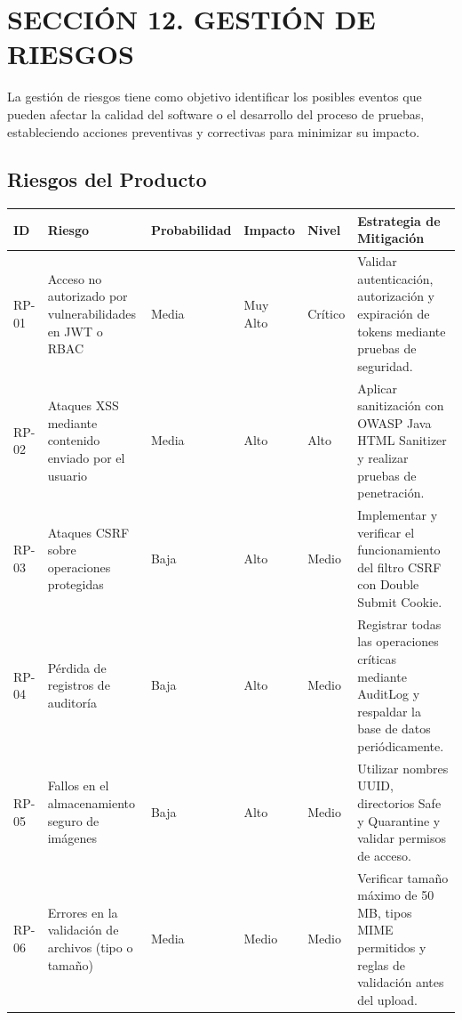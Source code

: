 \section{SECCIÓN 12. GESTIÓN DE RIESGOS}
La gestión de riesgos tiene como objetivo identificar los posibles eventos que pueden afectar la calidad del software o el desarrollo del proceso de pruebas, estableciendo acciones preventivas y correctivas para minimizar su impacto.

\subsection*{Riesgos del Producto}
\begin{longtable}{|p{1.5cm}|p{3.5cm}|p{2.5cm}|p{2cm}|p{2cm}|p{4cm}|}
\hline
\textbf{ID} & \textbf{Riesgo} & \textbf{Probabilidad} & \textbf{Impacto} & \textbf{Nivel} & \textbf{Estrategia de Mitigación} \\
\hline
RP-01 & Acceso no autorizado por vulnerabilidades en JWT o RBAC & Media & Muy Alto & Crítico & Validar autenticación, autorización y expiración de tokens mediante pruebas de seguridad. \\
\hline
RP-02 & Ataques XSS mediante contenido enviado por el usuario & Media & Alto & Alto & Aplicar sanitización con OWASP Java HTML Sanitizer y realizar pruebas de penetración. \\
\hline
RP-03 & Ataques CSRF sobre operaciones protegidas & Baja & Alto & Medio & Implementar y verificar el funcionamiento del filtro CSRF con Double Submit Cookie. \\
\hline
RP-04 & Pérdida de registros de auditoría & Baja & Alto & Medio & Registrar todas las operaciones críticas mediante AuditLog y respaldar la base de datos periódicamente. \\
\hline
RP-05 & Fallos en el almacenamiento seguro de imágenes & Baja & Alto & Medio & Utilizar nombres UUID, directorios Safe y Quarantine y validar permisos de acceso. \\
\hline
RP-06 & Errores en la validación de archivos (tipo o tamaño) & Media & Medio & Medio & Verificar tamaño máximo de 50 MB, tipos MIME permitidos y reglas de validación antes del upload. \\
\hline
\end{longtable}

